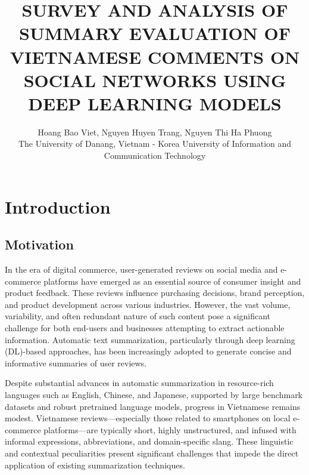 \documentclass{article}
\title{\textbf{\LARGE SURVEY AND ANALYSIS OF SUMMARY EVALUATION OF VIETNAMESE COMMENTS ON SOCIAL NETWORKS USING DEEP LEARNING MODELS}}
\author{
Hoang Bao Viet, 
Nguyen Huyen Trang, 
Nguyen Thi Ha Phuong \\
The University of Danang, Vietnam - Korea University of Information and Communication Technology
}
\date{}
\begin{document}
\sloppy


\section{Introduction}

\subsection{Motivation}
In the era of digital commerce, user-generated reviews on social media and e-commerce platforms have emerged as an essential source of consumer insight and product feedback. These reviews influence purchasing decisions, brand perception, and product development across various industries. However, the vast volume, variability, and often redundant nature of such content pose a significant challenge for both end-users and businesses attempting to extract actionable information. Automatic text summarization, particularly through deep learning (DL)-based approaches, has been increasingly adopted to generate concise and informative summaries of user reviews.

Despite substantial advances in automatic summarization in resource-rich languages such as English, Chinese, and Japanese, supported by large benchmark datasets and robust pretrained language models, progress in Vietnamese remains modest. Vietnamese reviews—especially those related to smartphones on local e-commerce platforms—are typically short, highly unstructured, and infused with informal expressions, abbreviations, and domain-specific slang. These linguistic and contextual peculiarities present significant challenges that impede the direct application of existing summarization techniques.
\end{document}
